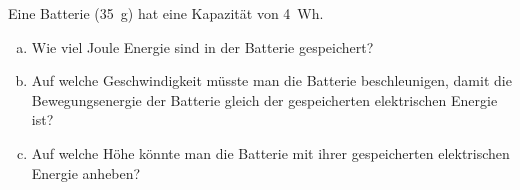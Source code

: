 \begin{aufgabe}
	Eine Batterie (\SI{35}{g}) hat eine Kapazität von \SI{4}{Wh}.
	\begin{enumerate} [a)]
		\item Wie viel Joule Energie sind in der Batterie gespeichert?
		\item Auf welche Geschwindigkeit müsste man die Batterie beschleunigen, damit die Bewegungsenergie der
			Batterie gleich der gespeicherten elektrischen Energie ist?
		\item Auf welche Höhe könnte man die Batterie mit ihrer gespeicherten elektrischen Energie anheben?
	\end{enumerate}
\end{aufgabe}

